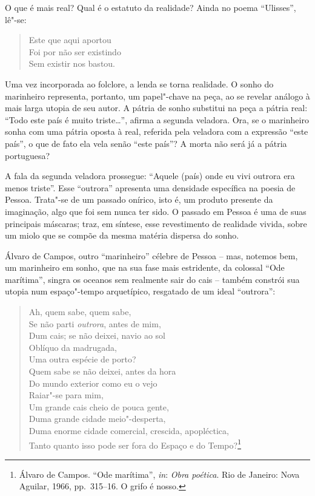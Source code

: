 O que é mais real? Qual é o estatuto da realidade?
Ainda no poema “Ulisses”, lê"-se: 
\begin{hedraquote}
\begin{verse}
Este que aqui aportou\\
Foi por não ser existindo\\ 
Sem existir nos bastou.
\end{verse}
\end{hedraquote}
Uma vez incorporada ao
folclore, a lenda se torna realidade. 
O sonho do marinheiro representa,
portanto, um papel"-chave na peça, ao se revelar 
análogo à mais larga
utopia de seu autor. A pátria de sonho 
substitui na peça a pátria real: “Todo este
país é muito triste\ldots{}”, afirma a segunda veladora. Ora, se
o marinheiro sonha com uma pátria oposta à
real, referida pela veladora
com a expressão “este país”, o que de
fato ela vela senão “este país”?
A morta não será já a pátria portuguesa? 

A fala da segunda veladora prossegue: “Aquele (país) onde eu vivi
outrora era menos triste”. Esse “outrora” apresenta uma densidade
específica na poesia de Pessoa.
Trata"-se de um passado onírico, isto é,
um produto presente da imaginação, algo que foi sem nunca ter
sido. O passado em Pessoa é uma de suas principais
máscaras; traz, em síntese, esse revestimento de realidade vivida,
sobre um miolo que se compõe da mesma matéria dispersa do sonho. 


Álvaro de Campos, outro “marinheiro” célebre
de Pessoa -- mas, notemos
bem, um marinheiro em sonho, que na sua fase mais estridente, da
colossal “Ode marítima”, singra os oceanos sem
realmente sair do cais --
também constrói sua utopia num espaço"-tempo 
arquetípico, resgatado de
um ideal “outrora”:

\begin{hedraquote}
\begin{verse}
Ah, quem sabe, quem sabe,\\
Se não parti \textit{outrora}, antes de mim,\\
Dum cais; se não deixei, navio ao sol\\
Oblíquo da madrugada,\\
Uma outra espécie de porto?\\
Quem sabe se não deixei, antes da hora\\
Do mundo exterior como eu o vejo\\
Raiar"-se para mim,\\
Um grande cais cheio de pouca gente,\\
Duma grande cidade meio"-desperta,\\
Duma enorme cidade comercial, crescida, \qb apopléctica,\\
Tanto quanto isso pode ser fora do Espaço e \qb do Tempo?\footnote{ 
Álvaro de Campos. “Ode marítima”, \textit{in}:
 \textit{Obra poética}. Rio de Janeiro:
Nova Aguilar,
1966, pp.~315--16. O grifo é nosso.}
\end{verse}
\end{hedraquote}

